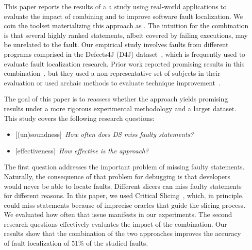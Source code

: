 \documentclass{article}
\begin{document}
This paper reports the results of a a study using real-world applications to
evaluate the impact of combining \ds{} and \sfl{} to improve software fault
localization. We coin the toolset materializing this approach as \comb{}.  The
intuition for the combination is that several highly ranked statements, albeit
covered by failing executions, may be unrelated to the fault. Our empirical
study involves \numFaults{} faults from \numPrograms{} different programs
comprised in the Defects4J (D4J) dataset~\cite{just-defects4j-issta2014}, which
is frequently used to evaluate fault localization research. Prior work reported
promising results in this
combination~\cite{Wotawa:2010:FLB:1848650.1849235,Alves:2011:FUD:2190078.2190115,DBLP:conf/ecai/HoferW12,lei-mao-dai-wang-2012,slicing-sfl-repair},
but they used a non-representative set of subjects in their evaluation or used
archaic methods to evaluate technique
improvement~\cite{Wu:2014:CLC:2610384.2610386,Lucia:2014:FFL:2642937.2642983,Wen:2016:LLB:2970276.2970359}.

The goal of this paper is to reassess whether the \comb{} approach yields
promising results under a more rigorous experimental methodology and a larger
dataset. This study covers the following research
questions:

\newcommand{\rqone}{How often does DS miss faulty statements?}
\newcommand{\rqthree}{How effective is the \comb{} approach?}

\begin{itemize}[leftmargin=*]
\item[]{\footnotesize[(un)soundness]}~\textit{\rqone{}}
\item[]{\footnotesize[effectiveness]}~\textit{\rqthree{}}
\end{itemize}

The first question addresses the important problem of missing faulty
statements. Naturally, the consequence of that problem for debugging
is that developers would never be able to locate faults. Different
slicers can miss faulty statements for different reasons. In this
paper, we used Critical Slicing~\cite{DeMillo:1996:CSS:229000.226310},
which, in principle, could miss statements because of imprecise
oracles that guide the slicing process. We evaluated how often that
issue manifests in our experiments. The second research questions
effectively evaluates the impact of the combination. Our
results show that the combination of the two approaches improves the accuracy
of fault localization of 51\% of the studied faults.
\end{document}
